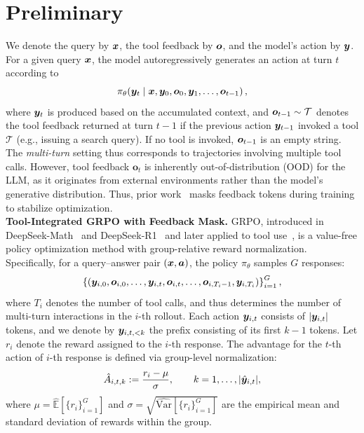 \section{Preliminary}
We denote the query by $\bm{x}$, the tool feedback by $\bm{o}$, and the model’s action by $\bm{y}$. For a given query $\bm{x}$, the model autoregressively generates an action at turn $t$ according to
\[
\pi_{\theta}\!\left(\bm{y}_t \mid \bm{x}, \bm{y}_0, \bm{o}_0, \bm{y}_1, \ldots, \bm{o}_{t-1}\right),
\]
where $\bm{y}_t$ is produced based on the accumulated context, and $\bm{o}_{t-1} \sim \mathcal{T}$ denotes the tool feedback returned at turn $t-1$ if the previous action $\bm{y}_{t-1}$ invoked a tool $\mathcal{T}$ (e.g., issuing a search query). If no tool is invoked, $\bm{o}_{t-1}$ is an empty string.
The \textit{multi-turn} setting thus corresponds to trajectories involving multiple tool calls. However, tool feedback $\mathbf{o}_t$ is inherently out-of-distribution (OOD) for the LLM, as it originates from external environments rather than the model’s generative distribution. Thus, prior work~\citep{jin2025search} masks feedback tokens during training to stabilize optimization.
\\
\textbf{Tool-Integrated GRPO with Feedback Mask.}
GRPO, introduced in DeepSeek-Math~\citep{shao2024deepseekmath} and DeepSeek-R1~\citep{guo2025deepseek} and later applied to tool use~\citep{jin2025search}, is a value-free policy optimization method with group-relative reward normalization.
Specifically, for a query–answer pair $(\bm{x}, \bm{a})$, the policy $\pi_\theta$ samples $G$ responses:  
\[
\left\{(\bm{y}_{i,0},\bm{o}_{i,0},\ldots,\bm{y}_{i,t},\bm{o}_{i,t},\ldots,\bm{o}_{i,T_i-1},\bm{y}_{i,T_i}) \right\}_{i=1}^G,
\]
where $T_i$ denotes the number of tool calls, and thus determines the number of multi-turn interactions in the $i$-th rollout.  
Each action $\bm{y}_{i,t}$ consists of $|\bm{y}_{i,t}|$ tokens, and we denote by $\bm{y}_{i,t,<k}$ the prefix consisting of its first $k-1$ tokens. Let $r_i$ denote the reward assigned to the $i$-th response.  
The advantage for the $t$-th action of $i$-th response is defined via group-level normalization:
\[
\hat{A}_{i,t,k} := \frac{r_i - \mu}{\sigma}, \qquad k = 1, \ldots, |\hat{\bm{y}}_{i,t}|,
\]
where $\mu = \widehat{\mathbb{E}}[\{r_i\}_{i=1}^G]$ and $\sigma = \sqrt{\widehat{\mathrm{Var}}[\{r_i\}_{i=1}^G]}$ are the empirical mean and standard deviation of rewards within the group.  
